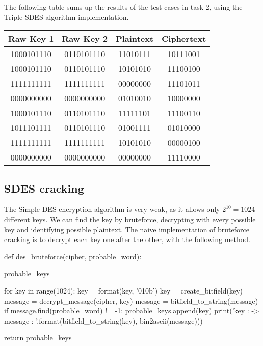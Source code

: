 \documentclass{article}
\begin{document}
The following table sums up the results of the test cases in task 2, using the Triple SDES algorithm implementation.

\begin{center}
    \begin{tabular}{|c c c c|}
        \hline
        \textbf{Raw Key 1} & \textbf{Raw Key 2} & \textbf{Plaintext} & \textbf{Ciphertext} \\
        \hline
        1000101110 & 0110101110 & 11010111 & 10111001 \\
        1000101110 & 0110101110 & 10101010 & 11100100 \\
        1111111111 & 1111111111 & 00000000 & 11101011 \\
        0000000000 & 0000000000 & 01010010 & 10000000 \\
        1000101110 & 0110101110 & 11111101 & 11100110 \\
        1011101111 & 0110101110 & 01001111 & 01010000 \\
        1111111111 & 1111111111 & 10101010 & 00000100 \\
        0000000000 & 0000000000 & 00000000 & 11110000 \\
        \hline
    \end{tabular}
\end{center}

\subsection{SDES cracking}

The Simple DES encryption algorithm is very weak, as it allows only $2^{10} = 1024$ different keys. We can find the key by bruteforce, decrypting with every possible key and identifying possible plaintext. The naive implementation of bruteforce cracking is to decrypt each key one after the other, with the following method.

\bigskip
\begin{python}
def des_bruteforce(cipher, probable_word):

probable_keys = []

for key in range(1024):
    key = format(key, '010b')
    key = create_bitfield(key)
    message = decrypt_message(cipher, key)
    message = bitfield_to_string(message)
    if message.find(probable_word) != -1:
        probable_keys.append(key)
        print('key : {} -> message : {}'.format(bitfield_to_string(key), bin2ascii(message)))

return probable_keys
\end{python}
\bigskip
\end{document}
